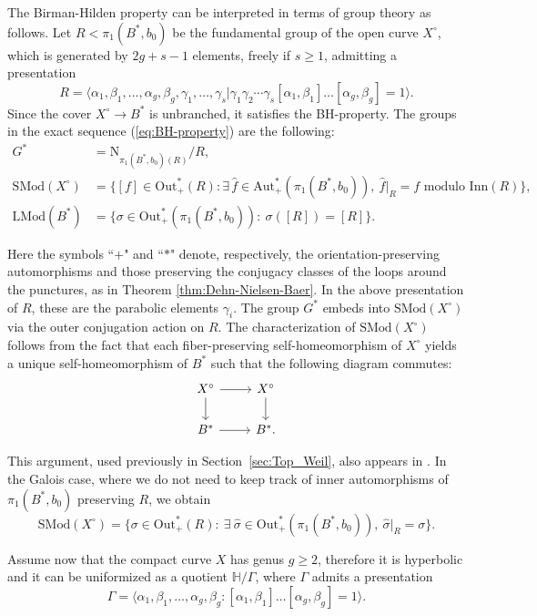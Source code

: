 \documentclass[10pt]{amsart}
\theoremstyle{definition}
\begin{document}
The Birman-Hilden property can be interpreted in terms of group theory as follows. Let $R < \pi_1(B^*,b_0)$ be the fundamental group of the open curve $ X^{\circ}$, which is generated by $2g+s-1$ elements, freely if $s\geq 1$, admitting a presentation
\[
    R= \langle \alpha_1, \beta_1, \ldots, \alpha_g, \beta_g, \gamma_1, \ldots, \gamma_s | \gamma_1 \gamma_2 \cdots \gamma_s[\alpha_1,\beta_1]\ldots [\alpha_g,\beta_g]=1 \rangle.
\]
Since the cover $X^\circ \rightarrow B^*$ is unbranched, it satisfies the BH-property. The groups in the exact sequence (\ref{eq:BH-property}) are the following:
\begin{align*}
    G^* &= \mathrm{N}_{\pi_1(B^*,b_0)(R)}/R, \\
    \mathrm{SMod}(X^\circ) &= \{ [f] \in \mathrm{Out}_+^*(R) : \exists\, \hat f \in \mathrm{Aut}_+^*(\pi_1(B^*,b_0)),\ \hat f|_R = f \text{ modulo } \mathrm{Inn}(R) \}, \\
    \mathrm{LMod}(B^*) &= \{\sigma \in  \mathrm{Out}_+^*(\pi_1(B^*,b_0)) : \ \sigma([R]) = [R]\}.
\end{align*}

Here the symbols “$+$" and “$*$" denote, respectively, the orientation-preserving automorphisms and those preserving
the conjugacy classes of the loops around the punctures, as in Theorem \ref{thm:Dehn-Nielsen-Baer}. 
In the above presentation of $R$, these are the parabolic elements $\gamma_i$. 
The group $G^*$ embeds into $\mathrm{SMod}(X^\circ)$ via the outer conjugation action on $R$. The characterization of $\mathrm{SMod}(X^\circ)$ follows from the fact that each fiber-preserving self-homeomorphism of $X^\circ$ yields a unique self-homeomorphism of $B^*$ such that the following diagram commutes: 
\[\begin{tikzcd}
X^\circ \arrow[r] \arrow[d] & X^\circ \arrow[d] \\
B^* \arrow[r]               & B^*  .            
\end{tikzcd}\]

This argument, used previously in Section~\ref{sec:Top_Weil}, also appears in \cite{SATO_2009}.
In the Galois case, where we do not need to keep track of inner automorphisms of $\pi_1(B^*,b_0)$ preserving $R$, we obtain
\[
\mathrm{SMod}(X^\circ) = \{ \sigma \in \mathrm{Out}_+^*(R) : \ \exists \ \hat \sigma \in \mathrm{Out}_+^*(\pi_1(B^*,b_0)), \ \hat \sigma|_R = \sigma \}.
\]
    
Assume now that the compact curve $X$ has genus $g\geq 2$, therefore it is hyperbolic and it can be uniformized as a quotient $\mathbb{H}/\Gamma$, where $\Gamma$ admits a presentation 
\begin{equation} \label{eq:Gam}
    \Gamma= \langle \alpha_1, \beta_1, \ldots, \alpha_g, \beta_g  : [\alpha_1,\beta_1]\ldots [\alpha_g,\beta_g]=1 \rangle.
\end{equation}
\end{document}
